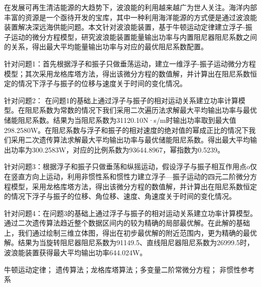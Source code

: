 \documentclass[12pt,utf8]{article}
\begin{document}

\begin{center} 
   \bfseries{}
   \vspace{2ex}
   
   \bfseries{}
\end{center}


在发展可再生清洁能源的大趋势下，波浪能的利用越来越广为世人关注。海洋内部丰富的资源是一个亟待开发的宝库，其中一种利用海洋能源的方式便是通过波浪能装置解决深远海供能问题。本文针对波浪能装置，基于牛顿运动定律建立浮子-振子运动的微分方程模型，研究波浪能装置能量输出功率与内置阻尼器阻尼系数之间的关系，得出最大平均能量输出功率与对应的最优阻尼系数配置。

针对问题1：首先根据浮子和振子只做垂荡运动，建立一维浮子-振子运动微分方程模型；其次采用龙格库塔方法，得出该微分方程的数值解，并计算出在阻尼系数恒定的情况下浮子与振子的位移与速度关于时间的变化情况。

针对问题2： 在问题1的基础上通过浮子与振子的相对运动关系建立功率计算模型。在阻尼系数为常数的情况下我们采用二次遍历法求解最大平均输出功率与最优储能阻尼系数。结果为当阻尼系数为31120.10N·s/m时输出功率取到最大值298.2580W。在阻尼系数与浮子和振子的相对速度的绝对值的幂成正比的情况下我们采用二次遗传算法求解最大平均输出功率与最优储能阻尼系数。得出最大平均输出功率为300.2583W，对应的比例系数为93644.8967，幂指数为0.5239。

针对问题3：根据浮子和振子只做垂荡和纵摇运动，假设浮子与振子相互作用点o仅在竖直方向上运动，利用非惯性系和惯性力建立浮子—振子运动的四元二阶微分方程模型，采用龙格库塔方法，得出该微分方程的数值解，并计算出在阻尼系数恒定的情况下浮子与振子的位移、角位移、速度、角速度关于时间的变化情况。

针对问题4：在问题3的基础上通过浮子与振子的相对运动关系建立功率计算模型。通过二次遗传算法趋近整个数据区间内的较为精确的局部最优解。在此解的基础上，我们通过绘制三维立体图，得出在初步最优解的附近范围内，更为精确的最优解。结果为当旋转阻尼器阻尼系数为91149.5、直线阻尼器阻尼系数为26999.5时，波浪能装置获得最大平均输出功率644.024W。


\vspace{2ex}

 牛顿运动定律； 遗传算法；龙格库塔算法；多变量二阶常微分方程； 非惯性参考系

%
\end{document}
